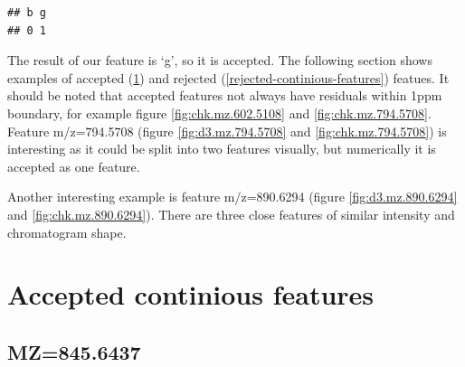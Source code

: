 \documentclass[]{article}
\newenvironment{Shaded}{\begin{snugshade}}{\end{snugshade}}
\newcommand{\KeywordTok}[1]{\textcolor[rgb]{0.13,0.29,0.53}{\textbf{#1}}}
\newcommand{\DataTypeTok}[1]{\textcolor[rgb]{0.13,0.29,0.53}{#1}}
\newcommand{\DecValTok}[1]{\textcolor[rgb]{0.00,0.00,0.81}{#1}}
\newcommand{\OperatorTok}[1]{\textcolor[rgb]{0.81,0.36,0.00}{\textbf{#1}}}
\newcommand{\NormalTok}[1]{#1}
\begin{document}
\begin{Shaded}
\end{Shaded}

\begin{verbatim}
## b g 
## 0 1
\end{verbatim}

The result of our feature is `g', so it is accepted. The following section shows examples of accepted (\ref{accepted-continious-features}) and rejected (\ref{rejected-continious-features}) featues. It should be noted that accepted features not always have residuals within 1ppm boundary, for example figure \ref{fig:chk.mz.602.5108} and \ref{fig:chk.mz.794.5708}. Feature m/z=794.5708 (figure \ref{fig:d3.mz.794.5708} and \ref{fig:chk.mz.794.5708}) is interesting as it could be split into two features visually, but numerically it is accepted as one feature. 

Another interesting example is feature  m/z=890.6294  (figure \ref{fig:d3.mz.890.6294} and \ref{fig:chk.mz.890.6294}). There are three close features of similar intensity and chromatogram shape.

\section{Accepted continious
features}\label{accepted-continious-features}

\subsection{MZ=845.6437}\label{mz845.6437}
\end{document}
